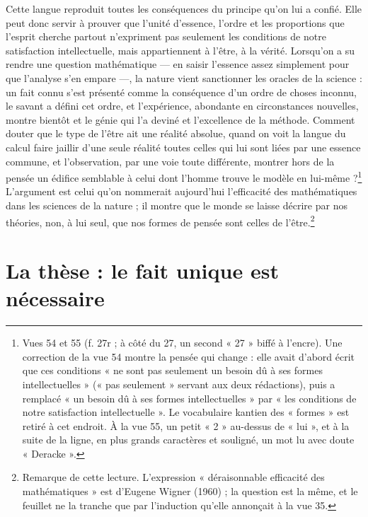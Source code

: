\documentclass[11pt,a4paper]{article}
\begin{document}
Cette langue reproduit toutes les conséquences du principe qu'on lui a confié.
Elle peut donc servir à prouver que l'unité d'essence, l'ordre et les
proportions que l'esprit cherche partout n'expriment pas seulement les
conditions de notre satisfaction intellectuelle, mais appartiennent à l'être,
à la vérité. Lorsqu'on a su rendre une question mathématique — en saisir
l'essence assez simplement pour que l'analyse s'en empare —, la nature vient
sanctionner les oracles de la science : un fait connu s'est présenté comme la
conséquence d'un ordre de choses inconnu, le savant a défini cet ordre, et
l'expérience, abondante en circonstances nouvelles, montre bientôt et le génie
qui l'a deviné et l'excellence de la méthode. Comment douter que le type de
l'être ait une réalité absolue, quand on voit la langue du calcul faire jaillir
d'une seule réalité toutes celles qui lui sont liées par une essence commune, et
l'observation, par une voie toute différente, montrer hors de la pensée un
édifice semblable à celui dont l'homme trouve le modèle en
lui-même ?\footnote{Vues 54 et 55 (f. 27r ; à côté du 27, un second « 27 »
biffé à l'encre). Une correction de la vue 54 montre la pensée qui change :
elle avait d'abord écrit que ces conditions « ne sont pas seulement un besoin
dû à ses formes intellectuelles » (« pas seulement » servant aux deux
rédactions), puis a remplacé « un besoin dû à ses formes
intellectuelles » par « les conditions de notre satisfaction intellectuelle ».
Le vocabulaire kantien des « formes » est retiré à cet endroit. À la vue 55, un
petit « 2 » au-dessus de « lui », et à la suite de la ligne, en plus grands
caractères et souligné, un mot lu avec doute « Deracke ».} L'argument est
celui qu'on nommerait aujourd'hui l'efficacité des mathématiques dans les
sciences de la nature ; il montre que le monde se laisse décrire par nos
théories, non, à lui seul, que nos formes de pensée sont celles de
l'être.\footnote{Remarque de cette lecture. L'expression « déraisonnable
efficacité des mathématiques » est d'Eugene Wigner (1960) ; la question est la
même, et le feuillet ne la tranche que par l'induction qu'elle annonçait à la
vue 35.}

\section*{La thèse : le fait unique est nécessaire}
\end{document}
